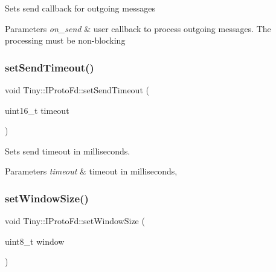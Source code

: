 Sets send callback for outgoing messages 
\begin{DoxyParams}{Parameters}
{\em on\+\_\+send} & user callback to process outgoing messages. The processing must be non-\/blocking \\
\hline
\end{DoxyParams}
\mbox{\label{classTiny_1_1IProtoFd_a2492655abda41d5b0fbda6f0e1c6badc}} 
\subsubsection{\texorpdfstring{set\+Send\+Timeout()}{setSendTimeout()}}
{\footnotesize\ttfamily void Tiny\+::\+I\+Proto\+Fd\+::set\+Send\+Timeout (\begin{DoxyParamCaption}\item[{uint16\+\_\+t}]{timeout }\end{DoxyParamCaption})\hspace{0.3cm}{\ttfamily [inline]}}

Sets send timeout in milliseconds. 
\begin{DoxyParams}{Parameters}
{\em timeout} & timeout in milliseconds, \\
\hline
\end{DoxyParams}
\mbox{\label{classTiny_1_1IProtoFd_adddcc24bf1ef40d39c944679a97c1ec4}} 
\subsubsection{\texorpdfstring{set\+Window\+Size()}{setWindowSize()}}
{\footnotesize\ttfamily void Tiny\+::\+I\+Proto\+Fd\+::set\+Window\+Size (\begin{DoxyParamCaption}\item[{uint8\+\_\+t}]{window }\end{DoxyParamCaption})\hspace{0.3cm}{\ttfamily [inline]}}

